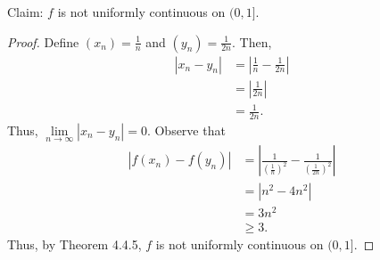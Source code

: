 \documentclass[12pt]{article}
\begin{document}
\newpage
{} Claim: $f$ is not uniformly continuous on $(0,1]$.
\begin{proof}
    Define $(x_n) = \frac1n$ and $(y_n) = \frac1{2n}$. Then,
    \begin{align*}
        |x_n - y_n| &= \left| \frac1n - \frac1{2n} \right| \\
                    &= \left| \frac{1}{2n} \right| \\
                    &= \frac1{2n}.
    \end{align*} Thus, $\lim\limits_{n \to \infty} |x_n - y_n| = 0$.
    Observe that
    \begin{align*}
        |f(x_n) - f(y_n)| &= \left| \frac1{\left(\frac1{n}\right)^2} - \frac1{\left(\frac1{2n}\right)^2} \right| \\
                          &= |n^2 - 4n^2| \\
                          &= 3n^2 \\
                          &\geq 3.
    \end{align*} Thus, by Theorem 4.4.5, $f$ is not uniformly continuous on $(0, 1]$.
\end{proof}
\end{document}

